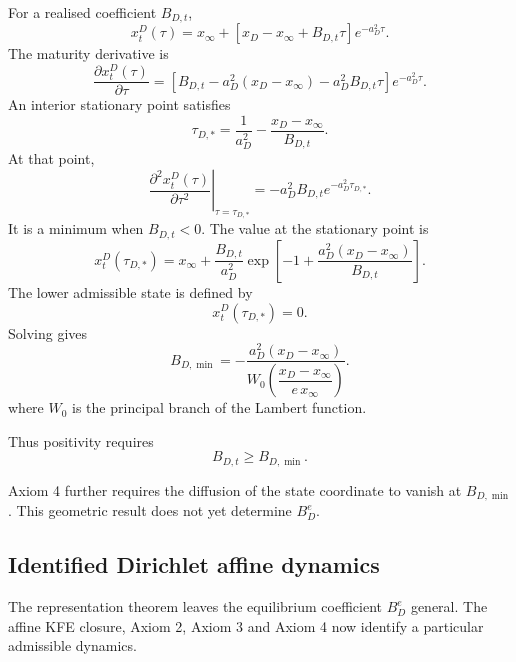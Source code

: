 \documentclass[12pt]{article}
\numberwithin{equation}{subsection}
\begin{document}
For a realised coefficient $B_{D,t}$,
\begin{equation}
x^D_t(\tau)
=
x_\infty+
\left[x_D-x_\infty+B_{D,t}\tau\right]e^{-a_D^2\tau}.
\end{equation}
The maturity derivative is
\begin{equation}
\frac{\partial x^D_t(\tau)}{\partial\tau}
=
\left[
B_{D,t}-a_D^2(x_D-x_\infty)-a_D^2B_{D,t}\tau
\right]e^{-a_D^2\tau}.
\end{equation}
An interior stationary point satisfies
\begin{equation}
\tau_{D,*}
=
\frac{1}{a_D^2}-\frac{x_D-x_\infty}{B_{D,t}}.
\end{equation}
At that point,
\begin{equation}
\left.\frac{\partial^2x^D_t(\tau)}{\partial\tau^2}\right|_{\tau=\tau_{D,*}}
=
-a_D^2B_{D,t}e^{-a_D^2\tau_{D,*}}.
\end{equation}
It is a minimum when $B_{D,t}<0$. The value at the stationary point is
\begin{equation}
x^D_t(\tau_{D,*})
=
x_\infty+
\frac{B_{D,t}}{a_D^2}
\exp\!\left[-1+\frac{a_D^2(x_D-x_\infty)}{B_{D,t}}\right].
\end{equation}
The lower admissible state is defined by
\begin{equation}
x^D_t(\tau_{D,*})=0.
\end{equation}
Solving gives
\begin{equation}
B_{D,\min}
=
-\frac{a_D^2(x_D-x_\infty)}
{W_0\!\left(\dfrac{x_D-x_\infty}{e\,x_\infty}\right)}.
\end{equation}
where $W_0$ is the principal branch of the Lambert function.

Thus positivity requires
\begin{equation}
B_{D,t}\ge B_{D,\min}.
\end{equation}


Axiom 4 further requires the diffusion of the state coordinate to vanish at $B_{D,\min}$. This geometric result does not yet determine $B_D^e$.

\subsection{Identified Dirichlet affine dynamics}

The representation theorem leaves the equilibrium coefficient $B_D^e$ general. The affine KFE closure, Axiom 2, Axiom 3 and Axiom 4 now identify a particular admissible dynamics.
\end{document}
